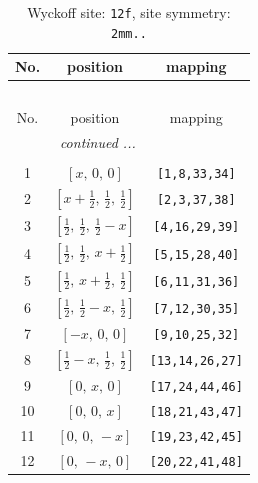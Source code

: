 \documentclass[fleqn,8pt]{jsarticle}
\begin{document}
\begin{longtable}{ccc}
\caption{Wyckoff site: {\tt 12f}, site symmetry: {\tt 2mm..}}
 \\
 \hline \hline
No. & position & mapping \\ \hline \endfirsthead

\multicolumn{2}{l}{\tablename\ \thetable{}} \\
 \hline \hline
No. & position & mapping \\ \hline \endhead

 \hline \hline
\multicolumn{2}{r}{\footnotesize\it continued ...} \\ \endfoot

 \hline \hline
\multicolumn{2}{r}{} \\ \endlastfoot

1 & $\left[ x,\, 0,\, 0 \right]$ & {\tt [1,8,33,34]} \\ \hline
2 & $\left[ x + \frac{1}{2},\, \frac{1}{2},\, \frac{1}{2} \right]$ & {\tt [2,3,37,38]} \\ \hline
3 & $\left[ \frac{1}{2},\, \frac{1}{2},\, \frac{1}{2} - x \right]$ & {\tt [4,16,29,39]} \\ \hline
4 & $\left[ \frac{1}{2},\, \frac{1}{2},\, x + \frac{1}{2} \right]$ & {\tt [5,15,28,40]} \\ \hline
5 & $\left[ \frac{1}{2},\, x + \frac{1}{2},\, \frac{1}{2} \right]$ & {\tt [6,11,31,36]} \\ \hline
6 & $\left[ \frac{1}{2},\, \frac{1}{2} - x,\, \frac{1}{2} \right]$ & {\tt [7,12,30,35]} \\ \hline
7 & $\left[ - x,\, 0,\, 0 \right]$ & {\tt [9,10,25,32]} \\ \hline
8 & $\left[ \frac{1}{2} - x,\, \frac{1}{2},\, \frac{1}{2} \right]$ & {\tt [13,14,26,27]} \\ \hline
9 & $\left[ 0,\, x,\, 0 \right]$ & {\tt [17,24,44,46]} \\ \hline
10 & $\left[ 0,\, 0,\, x \right]$ & {\tt [18,21,43,47]} \\ \hline
11 & $\left[ 0,\, 0,\, - x \right]$ & {\tt [19,23,42,45]} \\ \hline
12 & $\left[ 0,\, - x,\, 0 \right]$ & {\tt [20,22,41,48]} \\
\end{longtable}
\renewcommand{\arraystretch}{1.2}
\end{document}
